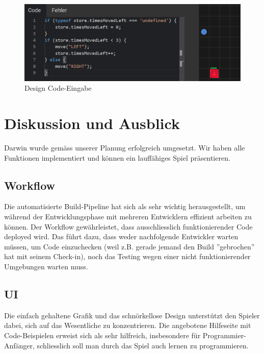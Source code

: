 \documentclass[11pt,a4paper,titlepage]{article}
\begin{document}
\begin{figure}[H]
	\centering
	\includegraphics[width=\textwidth]{game2.png}
	\caption{Design Code-Eingabe}
	\label{code-eingabe}
\end{figure}

\newpage

\section{Diskussion und Ausblick}
%

Darwin wurde gemäss unserer Planung erfolgreich umgesetzt. Wir haben alle Funktionen implementiert und können ein lauffähiges Spiel präsentieren.

\subsection{Workflow}

Die automatisierte Build-Pipeline hat sich als sehr wichtig herausgestellt, um während der Entwicklungsphase mit mehreren Entwicklern effizient arbeiten zu können. Der Workflow gewährleistet, dass ausschliesslich funktionierender Code deployed wird. Das führt dazu, dass weder nachfolgende Entwickler warten müssen, um Code einzuchecken (weil z.B. gerade jemand den Build ''gebrochen'' hat mit seinem Check-in), noch das Testing wegen einer nicht funktionierender Umgebungen warten muss.

\subsection{UI}

Die einfach gehaltene Grafik und das schnörkellose Design unterstützt den Spieler dabei, sich auf das Wesentliche zu konzentrieren.
Die angebotene Hilfeseite mit Code-Beispielen erweist sich als sehr hilfreich, insbesondere für Programmier-Anfänger, schliesslich soll man durch das Spiel auch lernen zu programmieren.
\end{document}
